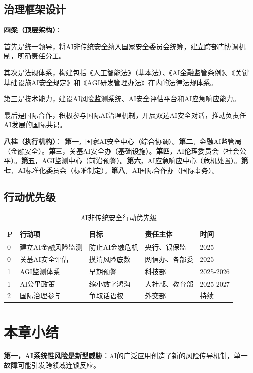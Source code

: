 \subsection{治理框架设计}

\textbf{四梁（顶层架构）}：

首先是统一领导，将AI非传统安全纳入国家安全委员会统筹，建立跨部门协调机制，明确责任分工。

其次是法规体系，构建包括《人工智能法》（基本法）、《AI金融监管条例》、《关键基础设施AI安全规定》和《AGI研发管理办法》在内的法律法规体系。

第三是技术能力，建设AI风险监测系统、AI安全评估平台和AI应急响应能力。

最后是国际合作，积极参与国际AI治理机制，开展双边AI安全对话，推动负责任AI发展的国际共识。

\textbf{八柱（执行机构）}：
\textbf{第一}，国家AI安全中心（综合协调）。\textbf{第二}，金融AI监管局（金融安全）。\textbf{第三}，关基AI安全办（基础设施）。\textbf{第四}，AI伦理委员会（社会公平）。\textbf{第五}，AGI监测中心（前沿预警）。\textbf{第六}，AI应急响应中心（危机处置）。\textbf{第七}，AI标准化委员会（标准制定）。\textbf{第八}，AI国际合作办（国际事务）。

\subsection{行动优先级}

\begin{table}[H]
\centering
\caption{AI非传统安全行动优先级}
\small
\begin{tabular}{p{0.5cm}p{3.3cm}p{3.3cm}p{2.8cm}p{1.8cm}}
\toprule
\textbf{P} & \textbf{行动项} & \textbf{目标} & \textbf{责任主体} & \textbf{时间} \\
\midrule
0 & 建立AI金融风险监测 & 防止AI金融危机 & 央行、银保监 & 2025 \\
0 & 关基AI安全评估 & 摸清风险底数 & 网信办、各部委 & 2025 \\
1 & AGI监测体系 & 早期预警 & 科技部 & 2025-2026 \\
1 & AI公平政策 & 缩小数字鸿沟 & 人社部、教育部 & 2025-2027 \\
2 & 国际治理参与 & 争取话语权 & 外交部 & 持续 \\
\bottomrule
\end{tabular}
\end{table}

\section{本章小结}
\textbf{第一，AI系统性风险是新型威胁}：AI的广泛应用创造了新的风险传导机制，单一故障可能引发跨领域连锁反应。

